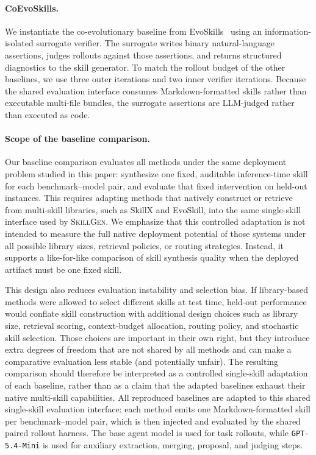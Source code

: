 \documentclass{article}
\begin{document}
\paragraph{CoEvoSkills.}
We instantiate the co-evolutionary baseline from EvoSkills~\citep{zhang2026evoskills} using an information-isolated surrogate verifier. The surrogate writes binary natural-language assertions, judges rollouts against those assertions, and returns structured diagnostics to the skill generator. To match the rollout budget of the other baselines, we use three outer iterations and two inner verifier iterations. Because the shared evaluation interface consumes Markdown-formatted skills rather than executable multi-file bundles, the surrogate assertions are LLM-judged rather than executed as code.

\paragraph{Scope of the baseline comparison.}
Our baseline comparison evaluates all methods under the same deployment problem studied in this paper: synthesize one fixed, auditable inference-time skill for each benchmark--model pair, and evaluate that fixed intervention on held-out instances. This requires adapting methods that natively construct or retrieve from multi-skill libraries, such as SkillX and EvoSkill, into the same single-skill interface used by \textsc{SkillGen}. We emphasize that this controlled adaptation is not intended to measure the full native deployment potential of those systems under all possible library sizes, retrieval policies, or routing strategies. Instead, it supports a like-for-like comparison of skill synthesis quality when the deployed artifact must be one fixed skill.

This design also reduces evaluation instability and selection bias. If library-based methods were allowed to select different skills at test time, held-out performance would conflate skill construction with additional design choices such as library size, retrieval scoring, context-budget allocation, routing policy, and stochastic skill selection. Those choices are important in their own right, but they introduce extra degrees of freedom that are not shared by all methods and can make a comparative evaluation less stable (and potentially unfair). The resulting comparison should therefore be interpreted as a controlled single-skill adaptation of each baseline, rather than as a claim that the adapted baselines exhaust their native multi-skill capabilities. All reproduced baselines are adapted to this shared single-skill evaluation interface: each method emits one Markdown-formatted skill per benchmark--model pair, which is then injected and evaluated by the shared paired rollout harness. The base agent model is used for task rollouts, while \texttt{GPT-5.4-Mini} is used for auxiliary extraction, merging, proposal, and judging steps.
\end{document}
